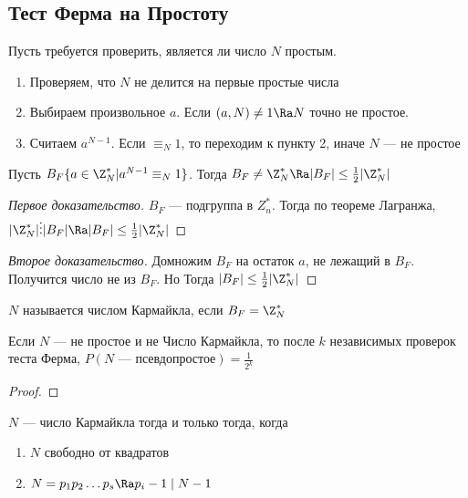 \subsection{Тест Ферма на Простоту}
Пусть требуется проверить, является ли число \(N\) простым.
\begin{enumerate}
    \item Проверяем, что \(N\) не делится на первые простые числа
    \item Выбираем произвольное \(a\). Если \((a, N) \ne 1 \Ra N\) точно не простое.
    \item Считаем \(a^{N - 1}\). Если \(\equiv_N 1\), то переходим к пункту 2, иначе \(N\) --- не простое
\end{enumerate}
\begin{definition}
    Пусть \(B_F \{a \in \Z^*_N| a^{N - 1} \equiv_N 1\}\). Тогда \(B_F \ne \Z_N^* \Ra |B_F| \le \frac{1}{2}|\Z_N^*|\)
\end{definition}
\begin{proof}[Первое доказательство]
    \(B_F\) --- подгруппа в \(Z_n^*\). Тогда по теореме Лагранжа, \(|\Z_N^*|\vdots|B_F| \Ra |B_F|\le\frac{1}{2}|\Z_N^*|\)
\end{proof}
\begin{proof}[Второе доказательство]
    Домножим \(B_F\) на остаток \(a\), не лежащий в \(B_F\). Получится число не из \(B_F\). Но Тогда \(|B_F|\le\frac{1}{2}|\Z_N^*|\)
\end{proof}
\begin{definition}
    \(N\) называется числом Кармайкла, если \(B_F = \Z_N^*\)
\end{definition}
\begin{proposition}
    Если \(N\) --- не простое и не Число Кармайкла, то после \(k\) независимых проверок теста Ферма, \(P(N\text{ --- псевдопростое}) = \frac{1}{2^k}\)
\end{proposition}
\begin{proof}
    
\end{proof}
\begin{theorem}
    \(N\) --- число Кармайкла тогда и только тогда, когда 
    \begin{enumerate}
        \item \(N\) свободно от квадратов
        \item \(N = p_1p_2\dots p_s \Ra p_i - 1\;|\;N - 1\)
    \end{enumerate}
\end{theorem}
